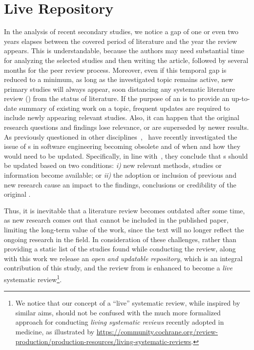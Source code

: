 \chapter{Live Repository}\label{chap:live}

In the analysis of recent secondary studies, we notice a gap of one or even two years elapses between the covered period of literature and the year the review appears. 
This is understandable, because the authors may need substantial time for analyzing the selected studies and then writing the article, followed by several months for the peer review process. 
Moreover, even if this temporal gap is reduced to a minimum, as long as the investigated topic remains active, new primary studies will always appear, soon distancing any systematic literature review (\slr) from the status of literature.  
If the purpose of an \slr is to provide an up-to-date summary of existing work on a topic, frequent updates are required to include newly appearing relevant studies.
Also, it can happen that the original research questions and findings lose relevance, or are superseded by newer results.
As previously questioned in other disciplines~\cite{Garneri3507},~\citet{MENDES2020110607} have recently investigated the issue of {\slr}s in software engineering becoming obsolete and of when and how they would need to be updated. 
Specifically, in line with~\cite{Garneri3507}, they conclude that {\slr}s should be updated based on two conditions: \textit{i)} new relevant methods, studies or information become available; or \textit{ii)} the adoption or inclusion of previous and new research cause an impact to the findings, conclusions or credibility of the original \slr.

Thus, it is inevitable that a literature review becomes outdated after some time, as new research comes out that cannot be included in the published paper, limiting the long-term value of the work, since the text will no longer reflect the ongoing research in the field.
In consideration of these challenges, rather than providing a static list of the studies found while conducting the review, along with this work we release an \textit{open and updatable repository}, which is an integral contribution of this study, and
the review from  is enhanced to become a \textit{live} systematic review\footnote{We notice that our concept of a ``live'' systematic review, while inspired by similar aims, should not be confused with the much more formalized approach for conducting \textit{living systematic reviews} recently adopted in medicine, as illustrated by \url{https://community.cochrane.org/review-production/production-resources/living-systematic-reviews}.}. 

